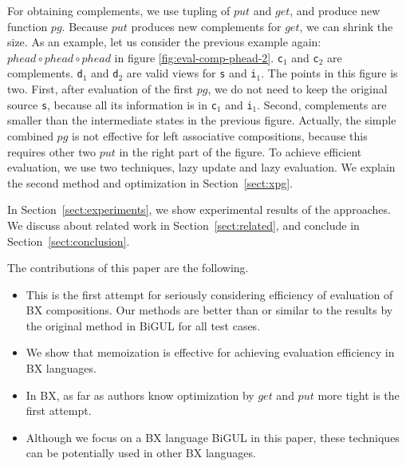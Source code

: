 For obtaining complements, we use tupling of $put$ and $get$, and produce new function $pg$. Because $put$ produces new complements for $get$, we can shrink the size.
As an example, let us consider the previous example again: $phead \circ phead \circ phead$ in figure \ref{fig:eval-comp-phead-2}. \texttt{c$_1$} and \texttt{c$_2$} are complements. \texttt{d$_1$} and \texttt{d$_2$} are valid views for \texttt{s} and \texttt{i$_1$}. The points in this figure is two. First, after evaluation of the first $pg$, we do not need to keep the original source \texttt{s}, because all its information is in \texttt{c$_1$} and \texttt{i$_1$}. Second, complements are smaller than the intermediate states in the previous figure.
Actually, the simple combined $pg$ is not effective for left associative compositions, because this requires other two $put$ in the right part of the figure. To achieve efficient evaluation, we use two techniques, lazy update and lazy evaluation. We explain the second method and optimization in Section~\ref{sect:xpg}.

In Section~\ref{sect:experiments}, we show experimental results of the approaches. We discuss about related work in Section~\ref{sect:related}, and conclude in Section~\ref{sect:conclusion}.


The contributions of this paper are the following.

\begin{itemize}
\item This is the first attempt for seriously considering efficiency of evaluation of BX compositions. Our methods are better than or similar to the results by the original method in BiGUL for all test cases.
\item We show that memoization is effective for achieving evaluation efficiency in BX languages.
\item In BX, as far as authors know optimization by $get$ and $put$ more tight is the first attempt.
\item Although we focus on a BX language BiGUL in this paper, these techniques can be potentially used in other BX languages.
\end{itemize}
